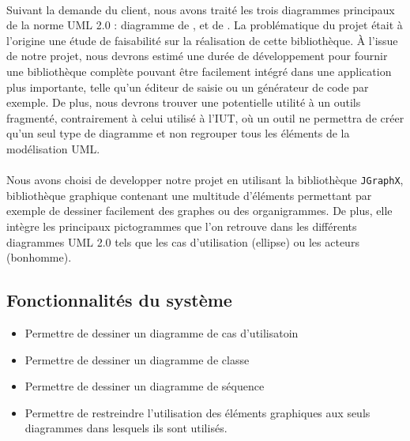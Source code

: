 \documentclass[12pt,a4paper,openany]{report}
\begin{document}
	\paragraph{}
	Suivant la demande du client, nous avons traité les trois diagrammes principaux de la norme UML 2.0 :
	diagramme de , 
	 et de .
	La problématique du projet était à l'origine une étude de faisabilité sur la réalisation de cette bibliothèque.
	À l'issue de notre projet, nous devrons estimé une durée de développement pour fournir une bibliothèque complète
	pouvant être facilement intégré dans une application plus importante, telle qu'un éditeur de saisie ou un générateur de code par exemple.
	De plus, nous devrons trouver une potentielle utilité à un outils fragmenté, contrairement à celui utilisé à l'IUT,
	où un outil ne permettra de créer qu'un seul type de diagramme et non regrouper tous les éléments de la modélisation UML.

	\paragraph{}
	Nous avons choisi de developper notre projet en utilisant la bibliothèque \texttt{JGraphX},
	bibliothèque graphique contenant une multitude d'éléments permettant
	par exemple de dessiner facilement des graphes ou des organigrammes. De plus, elle intègre les principaux 
	pictogrammes que l'on retrouve dans les différents diagrammes UML 2.0 tels que les cas d'utilisation (ellipse)
	ou les acteurs (bonhomme).
\newpage
	\subsection{Fonctionnalités du système}
	\begin{itemize}
		\item Permettre de dessiner un diagramme de cas d'utilisatoin
		\item Permettre de dessiner un diagramme de classe 
		\item Permettre de dessiner un diagramme de séquence 
		\item Permettre de restreindre l'utilisation des éléments graphiques aux seuls diagrammes dans lesquels ils sont utilisés.  \end{itemize}
\end{document}
